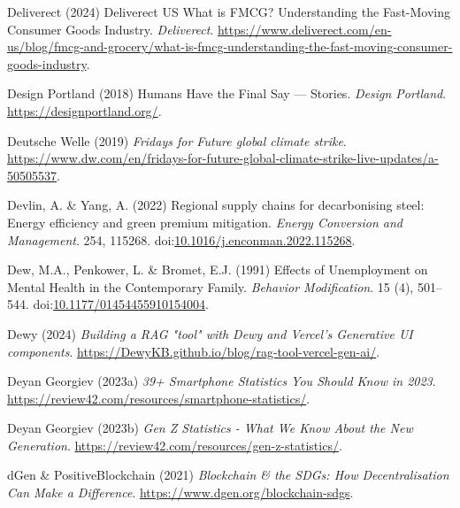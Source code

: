 \documentclass[
  letterpaper,
  DIV=11,
  numbers=noendperiod]{scrartcl}
\newlength{\cslhangindent}
\newenvironment{CSLReferences}[2] %
 {\begin{list}{}{%
  \setlength{\itemindent}{0pt}
  \setlength{\leftmargin}{0pt}
  \setlength{\parsep}{0pt}
  \ifodd #1
   \setlength{\leftmargin}{\cslhangindent}
   \setlength{\itemindent}{-1\cslhangindent}
  \fi
  \setlength{\itemsep}{#2\baselineskip}}}
 {\end{list}}
\begin{document}
\begin{CSLReferences}{0}{1}
Deliverect (2024) Deliverect {US} {\textbar} {What} is {FMCG}?
{Understanding} the {Fast-Moving Consumer Goods Industry}.
\emph{Deliverect}.
\url{https://www.deliverect.com/en-us/blog/fmcg-and-grocery/what-is-fmcg-understanding-the-fast-moving-consumer-goods-industry}.

Design Portland (2018) Humans {Have} the {Final Say} --- {Stories}.
\emph{Design Portland}. \url{https://designportland.org/}.

Deutsche Welle (2019) \emph{Fridays for {Future} global climate strike}.
\url{https://www.dw.com/en/fridays-for-future-global-climate-strike-live-updates/a-50505537}.

Devlin, A. \& Yang, A. (2022) Regional supply chains for decarbonising
steel: {Energy} efficiency and green premium mitigation. \emph{Energy
Conversion and Management}. 254, 115268.
doi:\href{https://doi.org/10.1016/j.enconman.2022.115268}{10.1016/j.enconman.2022.115268}.

Dew, M.A., Penkower, L. \& Bromet, E.J. (1991) Effects of {Unemployment}
on {Mental Health} in the {Contemporary Family}. \emph{Behavior
Modification}. 15 (4), 501--544.
doi:\href{https://doi.org/10.1177/01454455910154004}{10.1177/01454455910154004}.

Dewy (2024) \emph{Building a {RAG} "tool" with {Dewy} and {Vercel}'s
{Generative UI} components}.
\url{https://DewyKB.github.io/blog/rag-tool-vercel-gen-ai/}.

Deyan Georgiev (2023a) \emph{39+ {Smartphone Statistics You Should Know}
in 2023}. \url{https://review42.com/resources/smartphone-statistics/}.

Deyan Georgiev (2023b) \emph{Gen {Z Statistics} - {What We Know About}
the {New Generation}}.
\url{https://review42.com/resources/gen-z-statistics/}.

dGen \& PositiveBlockchain (2021) \emph{Blockchain \& the {SDGs}: {How
Decentralisation Can Make} a {Difference}}.
\url{https://www.dgen.org/blockchain-sdgs}.


\end{CSLReferences}
\end{document}
